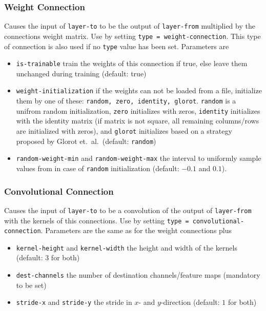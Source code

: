 \subsubsection*{Weight Connection}

Causes the input of \texttt{layer-to} to be the output of \texttt{layer-from} multiplied by the connections weight matrix. Use by setting \texttt{type = weight-connection}. This type of connection is also used if no \texttt{type} value has been set. Parameters are
\begin{itemize}
    \item \texttt{is-trainable} train the weights of this connection if true, else leave them unchanged during training (default: true)
    \item \texttt{weight-initialization} if the weights can not be loaded from a file, initialize them by one of these: \texttt{random, zero, identity, glorot}. \texttt{random} is a unifrom random initialization, \texttt{zero} initializes with zeros, \texttt{identity} initializes with the identity matrix (if matrix is not square, all remaining columns/rows are initialized with zeros), and \texttt{glorot} initializes based on a strategy proposed by Glorot et.\ al.\ (default: \texttt{random})
    \item \texttt{random-weight-min} and \texttt{random-weight-max} the interval to uniformly sample values from in case of \texttt{random} initialization (default: $ -0.1 $ and $ 0.1 $).
\end{itemize}

\subsubsection*{Convolutional Connection}

Causes the input of \texttt{layer-to} to be a convolution of the output of \texttt{layer-from} with the kernels of this connections. Use by setting \texttt{type = convolutional-connection}. Parameters are the same as for the weight connections plus
\begin{itemize}
    \item \texttt{kernel-height} and \texttt{kernel-width} the height and width of the kernels (default: $ 3 $ for both)
    \item \texttt{dest-channels} the number of destination channels/feature maps (mandatory to be set)
    \item \texttt{stride-x} and \texttt{stride-y} the stride in $ x $- and $ y $-direction (default: $ 1 $ for both)
\end{itemize}

